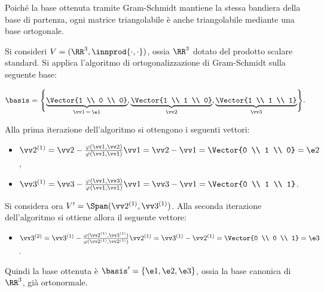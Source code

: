 \begin{remark}
	Poiché la base ottenuta tramite Gram-Schmidt mantiene la stessa bandiera della base di partenza,
	ogni matrice triangolabile è anche triangolabile mediante una base ortogonale.
\end{remark}

\begin{example}
	Si consideri $V = (\RR^3, \innprod{\cdot, \cdot})$, ossia $\RR^3$ dotato del prodotto scalare standard.
	Si applica l'algoritmo di ortogonalizzazione di Gram-Schmidt sulla seguente base:
	
	\[ \basis = \Biggl\{ \underbrace{\Vector{1 \\ 0 \\ 0}}_{\vv 1 \, = \, \e1}, \underbrace{\Vector{1 \\ 1 \\ 0}}_{\vv 2}, \underbrace{\Vector{1 \\ 1 \\ 1}}_{\vv 3} \Biggl\}. \]
	
	\vskip 0.05in
	
	Alla prima iterazione dell'algoritmo si ottengono i seguenti vettori:
	
	\begin{itemize}
		\item $\vv 2 ^{(1)} = \vv 2 -  \frac{\varphi(\vv 1, \vv 2)}{\varphi(\vv 1, \vv 1)} \vv 1 = \vv 2 - \vv 1 = \Vector{0 \\ 1 \\ 0} = \e 2$,
		\item $\vv 3 ^{(1)} = \vv 3 - \frac{\varphi(\vv 1, \vv 3)}{\varphi(\vv 1, \vv 1)} \vv 1 = \vv 3 - \vv 1 = \Vector{0 \\ 1 \\ 1}$.
	\end{itemize}
	
	Si considera ora $V' = \Span(\vv 2 ^{(1)}, \vv 3 ^{(1)})$. Alla seconda iterazione dell'algoritmo si
	ottiene allora il seguente vettore:
	
	\begin{itemize}
		\item $\vv 3 ^{(2)} = \vv 3 ^{(1)} - \frac{\varphi(\vv 2 ^{(1)},  \vv 3 ^{(1)})}{\varphi(\vv 2 ^{(1)}, \vv 2 ^{(1)})} \vv 2 ^{(1)} = \vv 3 ^{(1)} - \vv 2 ^{(1)} = \Vector{0 \\ 0 \\ 1} = \e 3$.
	\end{itemize}
	
	Quindi la base ottenuta è $\basis' = \{\e1, \e2, \e3\}$, ossia la base canonica di $\RR^3$, già
	ortonormale.
\end{example}

